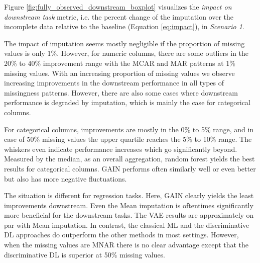 Figure \ref{fig:fully_observed_downstream_boxplot} visualizes the \textit{impact on downstream task} metric, i.e. the percent change of the imputation over the incomplete data relative to the baseline (Equation \ref{eq:impact}), in \textit{Scenario 1}.

The impact of imputation seems mostly negligible if the proportion of missing values is only 1\%. However, for numeric columns, there are some outliers in the 20\% to 40\% improvement range with the MCAR and MAR patterns at 1\% missing values. With an increasing proportion of missing values we observe increasing improvements in the downstream performance in all types of missingness patterns. However, there are also some cases where downstream performance is degraded by imputation, which is mainly the case for categorical columns. 

For categorical columns, improvements are mostly in the 0\% to 5\% range, and in case of 50\% missing values the upper quartile reaches the 5\% to 10\% range. The whiskers even indicate performance increases which go significantly beyond. Measured by the median, as an overall aggregation, random forest yields the best results for categorical columns. GAIN performs often similarly well or even better but also has more negative fluctuations.

The situation is different for regression tasks. Here, GAIN clearly yields the least improvements downstream. Even the Mean imputation is oftentimes significantly more beneficial for the downstream tasks. The VAE results are approximately on par with Mean imputation. In contrast, the classical ML and the discriminative DL approaches do outperform the other methods in most settings. However, when the missing values are MNAR there is no clear advantage except that the discriminative DL is superior at 50\% missing values.

